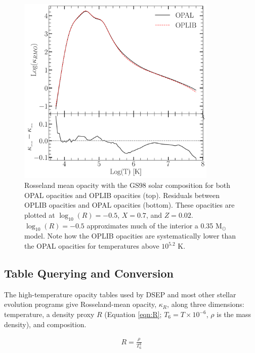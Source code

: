 \begin{figure}
	\centering
	\includegraphics[width=0.85\textwidth]{figures/jaoOpacity/OpacityComparision.pdf}
	\caption{Rosseland mean opacity with the GS98 solar composition for both
	OPAL opacities and OPLIB opacities (top). Residuals between OPLIB opacities
	and OPAL opacities (bottom). These opacities are plotted at $\log _{10}(R)
	= -0.5$, $X=0.7$, and $Z=0.02$. $\log _{10}(R)=-0.5$ approximates
	much of the interior a 0.35 M$_{\odot}$ model. Note how the OPLIB
	opacities are systematically lower than the OPAL opacities for temperatures
	above $10^{5.2}$ K.}
	\label{fig:opacComp}
\end{figure}

\subsection{Table Querying and Conversion}
The high-temperature opacity tables used by DSEP and most other stellar
evolution programs give Rosseland-mean opacity, $\kappa_{R}$, along three
dimensions: temperature, a density proxy $R$ (Equation \ref{eqn:R}; $T_{6} =
T\times10^{-6}$, $\rho$ is the mass density), and composition. 

\begin{align} \label{eqn:R}
	R = \frac{\rho}{T_{6}^{3}}
\end{align}

